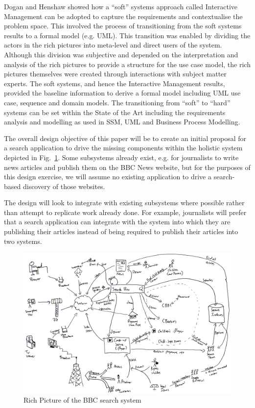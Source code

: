\documentclass{llncs}
\begin{document}
Dogan and Henshaw\cite{dogan2010transition}
showed how a ``soft'' systems approach called Interactive
Management can be adopted to capture the requirements and contextualise the
problem space. This involved the process of transitioning from the soft systems
results to a formal model (e.g. UML). This transition was enabled by dividing
the actors in the rich pictures into meta-level and direct users of the system.
Although this division was subjective and depended on the interpretation  and
analysis of the rich pictures to provide a structure for the use case model,
the rich pictures themselves were created through interactions with subject
matter experts. The soft systems, and hence the Interactive Management results,
provided the baseline information to derive a formal model including UML use
case, sequence and domain models. The transitioning from ``soft'' to ``hard''
systems can be set within the State of the Art including the requirements
analysis and modelling as used in SSM, UML and Business Process Modelling.

The overall design objective of this paper will be to create an initial
proposal for a
search application to drive the missing components within the holistic
system depicted in Fig.~\ref{rich-picture}. Some subsystems already
exist, e.g. for journalists to write news articles and publish them on the
BBC News website, but for the purposes of this design exercise, we will
assume no existing application to drive a search-based discovery of
those websites.

The design will look to integrate with
existing subsystems where possible rather than attempt to replicate
work already done. For example, journalists will prefer that a search
application can integrate with the system into which they are publishing
their articles instead of being required to publish their articles into
two systems.

\begin{figure}
  \begin{center}
    \includegraphics[width=\linewidth]{rich-picture.png}
  \end{center}
  \caption{Rich Picture of the BBC search system\label{rich-picture}}
\end{figure}
\end{document}
